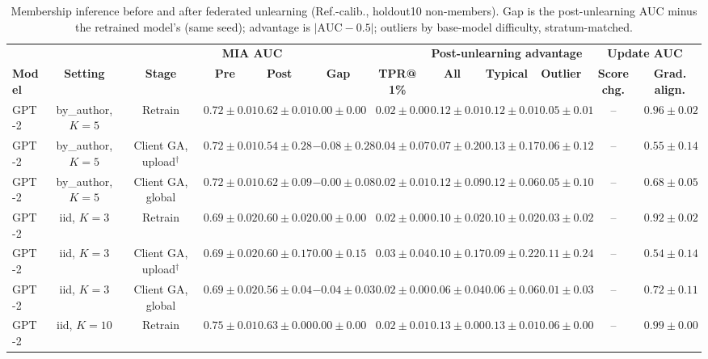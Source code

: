 \begin{table}[t]
\centering
\caption{Membership inference before and after federated unlearning (Ref.-calib., holdout10 non-members). Gap is the post-unlearning AUC minus the retrained model's (same seed); advantage is $|\mathrm{AUC}-0.5|$; outliers by base-model difficulty, stratum-matched.}
\label{tab:federated-ref-calibrated-holdout10}
\footnotesize
\renewcommand{\arraystretch}{1.2}
\setlength{\tabcolsep}{2pt}
\begin{tabular*}{\textwidth}{@{\extracolsep{\fill}}lccccccccccc@{}}
\toprule
 & & & \multicolumn{2}{c}{\textbf{MIA AUC}} & & & \multicolumn{3}{c}{\textbf{Post-unlearning advantage}} & \multicolumn{2}{c}{\textbf{Update AUC}} \\
\cmidrule(lr){4-5}\cmidrule(lr){8-10}\cmidrule(lr){11-12}
\textbf{Model} & \textbf{Setting} & \textbf{Stage} & \textbf{Pre} & \textbf{Post} & \textbf{Gap} & \textbf{TPR@1\%} & \textbf{All} & \textbf{Typical} & \textbf{Outlier} & \textbf{Score chg.} & \textbf{Grad. align.} \\
\midrule
GPT-2 & by\_author, $K=5$ & Retrain & $0.72 \pm 0.01$ & $0.62 \pm 0.01$ & $0.00 \pm 0.00$ & $0.02 \pm 0.00$ & $0.12 \pm 0.01$ & $0.12 \pm 0.01$ & $0.05 \pm 0.01$ & -- & $0.96 \pm 0.02$ \\
GPT-2 & by\_author, $K=5$ & Client GA, upload$^{\dagger}$ & $0.72 \pm 0.01$ & $0.54 \pm 0.28$ & $-0.08 \pm 0.28$ & $0.04 \pm 0.07$ & $0.07 \pm 0.20$ & $0.13 \pm 0.17$ & $0.06 \pm 0.12$ & -- & $0.55 \pm 0.14$ \\
GPT-2 & by\_author, $K=5$ & Client GA, global & $0.72 \pm 0.01$ & $0.62 \pm 0.09$ & $-0.00 \pm 0.08$ & $0.02 \pm 0.01$ & $0.12 \pm 0.09$ & $0.12 \pm 0.06$ & $0.05 \pm 0.10$ & -- & $0.68 \pm 0.05$ \\
GPT-2 & iid, $K=3$ & Retrain & $0.69 \pm 0.02$ & $0.60 \pm 0.02$ & $0.00 \pm 0.00$ & $0.02 \pm 0.00$ & $0.10 \pm 0.02$ & $0.10 \pm 0.02$ & $0.03 \pm 0.02$ & -- & $0.92 \pm 0.02$ \\
GPT-2 & iid, $K=3$ & Client GA, upload$^{\dagger}$ & $0.69 \pm 0.02$ & $0.60 \pm 0.17$ & $0.00 \pm 0.15$ & $0.03 \pm 0.04$ & $0.10 \pm 0.17$ & $0.09 \pm 0.22$ & $0.11 \pm 0.24$ & -- & $0.54 \pm 0.14$ \\
GPT-2 & iid, $K=3$ & Client GA, global & $0.69 \pm 0.02$ & $0.56 \pm 0.04$ & $-0.04 \pm 0.03$ & $0.02 \pm 0.00$ & $0.06 \pm 0.04$ & $0.06 \pm 0.06$ & $0.01 \pm 0.03$ & -- & $0.72 \pm 0.11$ \\
GPT-2 & iid, $K=10$ & Retrain & $0.75 \pm 0.01$ & $0.63 \pm 0.00$ & $0.00 \pm 0.00$ & $0.02 \pm 0.01$ & $0.13 \pm 0.00$ & $0.13 \pm 0.01$ & $0.06 \pm 0.00$ & -- & $0.99 \pm 0.00$ \\

\end{tabular*}
\end{table}
